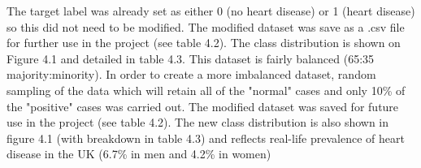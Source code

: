 The target label was already set as either 0 (no heart disease) or 1 (heart disease) so this did not need to be modified. The modified dataset was save as a .csv file for further use in the project (see table 4.2).\newline
The class distribution is shown on Figure 4.1 and detailed in table 4.3.\newline
This dataset is fairly balanced (65:35 majority:minority). In order to create a more imbalanced dataset, random sampling of the data which will retain all of the "normal" cases and only 10\% of the "positive" cases was carried out. The modified dataset was saved for future use in the project (see table 4.2). The new class distribution is also shown in figure 4.1 (with breakdown in table 4.3) and reflects real-life prevalence of heart disease in the UK (6.7\% in men and 4.2\% in women) \citep{NHS:2018wa}\newline

